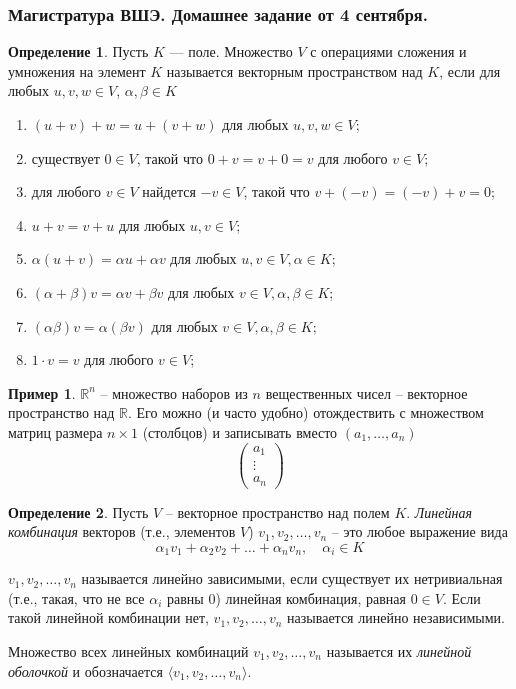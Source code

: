 \documentclass[12pt, fleqn]{extarticle}
\newcommand{\real}{\mathbb{R}}
\theoremstyle{definition}
\newtheorem{definition}{Определение}
\newtheorem*{example}{Пример}
\theoremstyle{remark}
\begin{document}
\clearpage

\thispagestyle{empty}
\subsubsection*{Магистратура ВШЭ. Домашнее задание от 4 сентября.}

\begin{definition}
Пусть $K$ — поле. Множество $V$ с операциями сложения
и умножения на элемент $K$ называется векторным пространством над $K$, если
для любых $u, v, w \in V$, $\alpha, \beta \in K$
\begin{enumerate}[topsep = 0ex, itemsep = -0.9ex]
\item $(u + v) + w = u + (v + w)$ для любых $u, v, w \in V$;
\item существует $0 \in V$, такой что $0 + v = v + 0 = v$ для любого $v \in V$;
\item для любого $v \in V$ найдется $-v \in V$, такой что $v + (-v) = (-v) + v = 0$;
\item $u + v = v + u$ для любых $u, v \in V$;
\item $\alpha (u + v) = \alpha u + \alpha v$ для любых $u, v \in V, \alpha \in K$;
\item $(\alpha + \beta)v = \alpha v + \beta v$ для любых $v \in V, \alpha, \beta \in K$;
\item $(\alpha\beta)v = \alpha(\beta v)$ для любых $v \in V, \alpha, \beta \in K$;
\item $1 \cdot v = v$ для любого $v \in V$;
\end{enumerate}

\end{definition}

\begin{example}
$\real^{n}$ -- множество наборов из $n$ вещественных чисел -- векторное пространство над $\real$.
Его можно (и часто удобно) отождествить с множеством матриц размера $n \times 1$ (столбцов)
и записывать вместо $(a_{1}, \ldots, a_{n})$
$$\left( \begin{array}{c}
 a_{1}\\
\vdots \\
a_{n} \end{array} \right)
$$
\end{example}


\begin{definition}
Пусть $V$ -- векторное пространство над полем $K$. 
{\it Линейная комбинация} векторов (т.е., элементов $V$) $v_{1}, v_{2}, \ldots, v_{n}$ 
-- это любое выражение вида 
$$\alpha_{1}v_{1} + \alpha_{2}v_{2} + \ldots + \alpha_{n}v_{n}, \quad \alpha_{i} \in K$$

$v_{1}, v_{2}, \ldots, v_{n}$ называется линейно зависимыми, если
существует их нетривиальная (т.е., такая, что не все $\alpha_{i}$ равны 0)
линейная комбинация, равная $0 \in V$. Если  такой линейной комбинации нет,
$v_{1}, v_{2}, \ldots, v_{n}$ называется линейно независимыми.

Множество всех линейных комбинаций $v_{1}, v_{2}, \ldots, v_{n}$ 
называется их {\it линейной оболочкой} и обозначается
$\langle v_{1}, v_{2}, \ldots, v_{n} \rangle$.
\end{definition}
\end{document}
